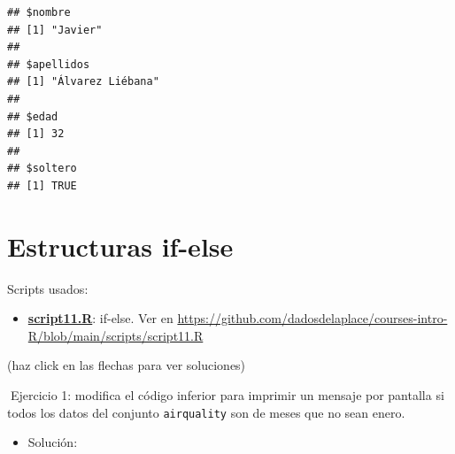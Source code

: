 \documentclass[11pt,]{book}
\newenvironment{Shaded}{\begin{snugshade}}{\end{snugshade}}
\newcommand{\CommentTok}[1]{\textcolor[rgb]{0.37,0.37,0.37}{\textit{#1}}}
\newcommand{\ControlFlowTok}[1]{\textcolor[rgb]{0.27,0.27,0.27}{\textbf{#1}}}
\newcommand{\DecValTok}[1]{\textcolor[rgb]{0.06,0.06,0.06}{#1}}
\newcommand{\KeywordTok}[1]{\textcolor[rgb]{0.27,0.27,0.27}{\textbf{#1}}}
\newcommand{\NormalTok}[1]{#1}
\newcommand{\OperatorTok}[1]{\textcolor[rgb]{0.43,0.43,0.43}{\textbf{#1}}}
\newcommand{\StringTok}[1]{\textcolor[rgb]{0.5,0.5,0.5}{#1}}
\providecommand{\tightlist}{%
  \setlength{\itemsep}{0pt}\setlength{\parskip}{0pt}}
\begin{document}
\begin{verbatim}
## $nombre
## [1] "Javier"
## 
## $apellidos
## [1] "Álvarez Liébana"
## 
## $edad
## [1] 32
## 
## $soltero
## [1] TRUE
\end{verbatim}

\hypertarget{estructuras-if-else}{%
\section{Estructuras if-else}\label{estructuras-if-else}}

\begin{blackbox}

Scripts usados:

\begin{itemize}
\tightlist
\item
  \href{https://github.com/dadosdelaplace/courses-intro-R/blob/main/scripts/script11.R}{\textbf{script11.R}}: if-else. Ver en \url{https://github.com/dadosdelaplace/courses-intro-R/blob/main/scripts/script11.R}
\end{itemize}


\end{blackbox}

(haz click en las flechas para ver soluciones)

📝Ejercicio 1: modifica el código inferior para imprimir un mensaje por pantalla si todos los datos del conjunto \texttt{airquality} son de meses que no sean enero.

\begin{Shaded}
\end{Shaded}

\begin{itemize}
\tightlist
\item
  Solución:
\end{itemize}
\end{document}
